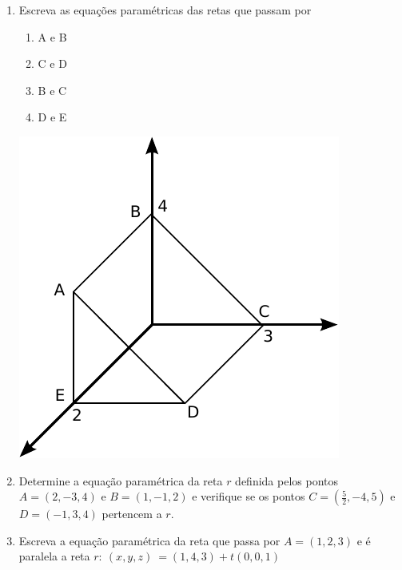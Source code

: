 \documentclass[a4paper,5pt]{amsbook}
\begin{document}
\begin{enumerate}
	\vspace{0.3cm}
	\item Escreva as equa\c{c}\~oes param\'etricas das retas que passam por

	\begin{minipage}{0.4\textwidth}
		\begin{enumerate}
			\item A e B
			\vspace{0.2cm}
			\item C e D
			\vspace{0.2cm}
			\item B e C
			\vspace{0.2cm}
			\item D e E
		\end{enumerate}
	\end{minipage}
	\begin{minipage}{0.4\textwidth}
		\includegraphics[scale=0.6]{fig/lista7_1.pdf}
	\end{minipage}

	\vspace{0.3cm}
	\item Determine a equa\c{c}\~ao param\'etrica da reta $r$ definida pelos pontos $A
		= (2, -3, 4)$ e $B = (1, -1, 2)$ e verifique se os pontos $C =
		(\frac{5}{2}, -4, 5)$ e $D = (-1, 3, 4)$ pertencem a $r$.
	
	\vspace{0.3cm}
	\item Escreva a equa\c{c}\~ao param\'etrica da reta que passa por $A = (1, 2, 3)$ e
		\'e paralela a reta $r:~(x, y, z)~=(1, 4, 3) + t(0, 0, 1)$
	

\end{enumerate}
\end{document}
